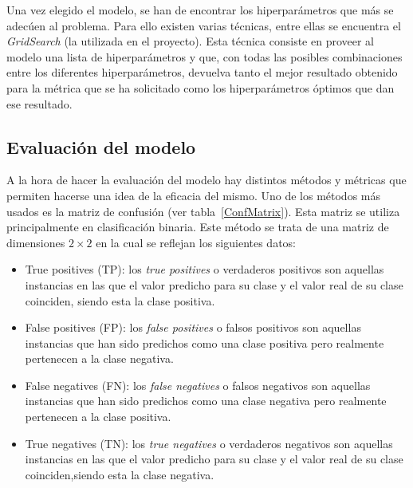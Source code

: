 Una vez elegido el modelo, se han de encontrar los hiperparámetros que más se adecúen al problema. Para ello existen varias técnicas, entre ellas se encuentra el \textit{GridSearch} (la utilizada en el proyecto). Esta técnica consiste en proveer al modelo una lista de hiperparámetros y que, con todas las posibles combinaciones entre los diferentes hiperparámetros, devuelva tanto el mejor resultado obtenido para la métrica que se ha solicitado como los hiperparámetros óptimos que dan ese resultado.




\subsection{Evaluación del modelo}


A la hora de hacer la evaluación del modelo hay distintos métodos y métricas que permiten hacerse una idea de la eficacia del mismo. Uno de los métodos más usados es la matriz de confusión (ver tabla~\ref{ConfMatrix}). Esta matriz se utiliza principalmente en clasificación binaria. Este método se trata de una matriz de dimensiones $2\times2$ en la cual se reflejan los siguientes datos:
\begin{itemize}
\item True positives (TP): los \textit{true positives} o verdaderos positivos son aquellas instancias en las que el valor predicho para su clase y el valor real de su clase coinciden, siendo esta la clase positiva. 
\item False positives (FP): los \textit{false positives} o falsos positivos son aquellas instancias que han sido predichos como una clase positiva pero realmente pertenecen a la clase negativa.
\item False negatives (FN): los \textit{false negatives} o falsos negativos son aquellas instancias que han sido predichos como una clase negativa pero realmente pertenecen a la clase positiva.
\item True negatives (TN): los \textit{true negatives} o verdaderos negativos son aquellas instancias en las que el valor predicho para su clase y el valor real de su clase coinciden,siendo esta la clase negativa. 
\end{itemize} 



